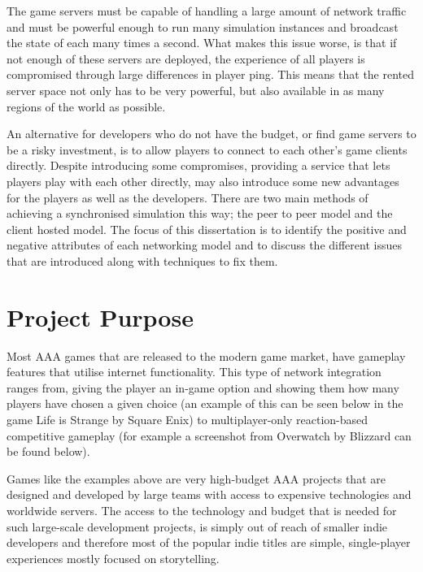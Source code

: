 The game servers must be capable of handling a large amount of network traffic and must be powerful enough to run many simulation instances and broadcast the state of each many times a second. What makes this issue worse, is that if not enough of these servers are deployed, the experience of all players is compromised through large differences in player ping. This means that the rented server space not only has to be very powerful, but also available in as many regions of the world as possible.

An alternative for developers who do not have the budget, or find game servers to be a risky investment, is to allow players to connect to each other's game clients directly. Despite introducing some compromises, providing a service that lets players play with each other directly, may also introduce some new advantages for the players as well as the developers. There are two main methods of achieving a synchronised simulation this way; the peer to peer model and the client hosted model. The focus of this dissertation is to identify the positive and negative attributes of each networking model and to discuss the different issues that are introduced along with techniques to fix them.


\section{Project Purpose}
Most AAA games that are released to the modern game market, have gameplay features that utilise internet functionality. This type of network integration ranges from, giving the player an in-game option and showing them how many players have chosen a given choice (an example of this can be seen below in the game Life is Strange by Square Enix) to multiplayer-only reaction-based competitive gameplay (for example a screenshot from Overwatch by Blizzard can be found below).

\begin{figure}[!h]
  \centering
{}
  \qquad
\end{figure}

Games like the examples above are very high-budget AAA projects that are designed and developed by large teams with access to expensive technologies and worldwide servers. The access to the technology and budget that is needed for such large-scale development projects, is simply out of reach of smaller indie developers and therefore most of the popular indie titles are simple, single-player experiences mostly focused on storytelling.

